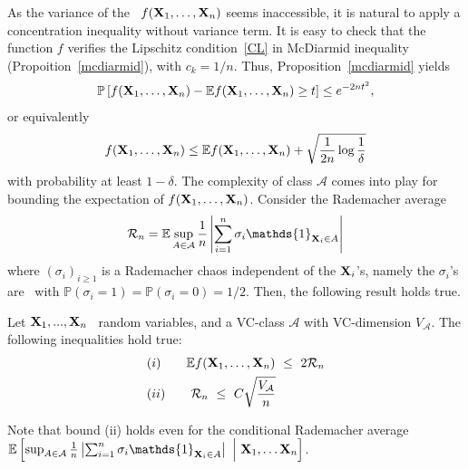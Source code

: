 As the variance of the \rv~$f(\mathbf X_1,\ldots, \mathbf X_n)$ seems inaccessible, it is natural to apply a concentration inequality without variance term. It is easy to check that the function $f$ verifies the Lipschitz condition~\ref{CL} in McDiarmid inequality (Propoition~\ref{mcdiarmid}), with $c_k = 1/n$. Thus, Proposition~\ref{mcdiarmid} yields
\begin{align*}
\mathbb{P}\left[f(\mathbf X_1,\ldots,\mathbf X_n)-\mathbb{E}f(\mathbf X_1,\ldots,\mathbf X_n) \geq t\right] \leq e^{-2nt^2},
\end{align*}
or equivalently
\begin{align}
\label{eq:mcd1}
f(\mathbf X_1,\ldots,\mathbf X_n) \le \mathbb{E}f(\mathbf X_1,\ldots,\mathbf X_n) + \sqrt{\frac{1}{2n} \log{\frac{1}{\delta}}}
\end{align}
with probability at least $1-\delta$.
The complexity of class $\mathcal{A}$ comes into play for bounding the expectation of $f(\mathbf X_1,\ldots,\mathbf X_n)$.
Consider the Rademacher average $$\mathcal{R}_n = \mathbb{E} \sup_{A \in \mathcal{A}} \frac{1}{n} \left | \sum_{i=1}^{n} \sigma_i \mathds{1}_{\mb X_i \in A}\right|$$ where $(\sigma_i)_{i \ge 1}$ is a Rademacher chaos independent of the $\mathbf X_i$'s, namely the $\sigma_i$'s are \iid~with $\mathbb{P}(\sigma_i = 1) = \mathbb{P}(\sigma_i = 0) = 1/2$.
Then, the following result holds true.
\begin{theorem}
\label{back:thm-rademacher}
Let $\mathbf X_1,...,\mathbf X_n$ \iid~random variables, and a VC-class $\mathcal{A}$ with VC-dimension $V_{\mathcal{A}}$.
The following inequalities hold true:
\begin{align*}
&(i)~~~~~~  \mathbb{E}f(\mathbf X_1,\ldots,\mathbf X_n) ~\le~ 2 \mathcal{R}_n\\
&(ii)~~~~~~ \mathcal{R}_n ~\le~ C \sqrt{\frac{V_{\mathcal{A}}}{n}}
\end{align*}
\end{theorem}
\begin{remark}
Note that bound (ii) holds even for the conditional Rademacher average $\mathbb{E} \left[\sup_{A \in \mathcal{A}} \frac{1}{n} \left | \sum_{i=1}^{n} \sigma_i \mathds{1}_{\mb X_i \in A}\right|  ~\Big|~ \mb X_1,\ldots \mb X_n \right]$.
\end{remark}
